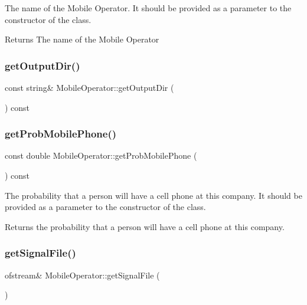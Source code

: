 The name of the Mobile Operator. It should be provided as a parameter to the constructor of the class. \begin{DoxyReturn}{Returns}
The name of the Mobile Operator 
\end{DoxyReturn}
\mbox{\label{class_mobile_operator_a58ac70813094ddefdf0ba2552ec31fe9}} 
\subsubsection{\texorpdfstring{get\+Output\+Dir()}{getOutputDir()}}
{\footnotesize\ttfamily const string\& Mobile\+Operator\+::get\+Output\+Dir (\begin{DoxyParamCaption}{ }\end{DoxyParamCaption}) const}

\mbox{\label{class_mobile_operator_afe59edb4ba22cea7fab968fdd1e2ce31}} 
\subsubsection{\texorpdfstring{get\+Prob\+Mobile\+Phone()}{getProbMobilePhone()}}
{\footnotesize\ttfamily const double Mobile\+Operator\+::get\+Prob\+Mobile\+Phone (\begin{DoxyParamCaption}{ }\end{DoxyParamCaption}) const}

The probability that a person will have a cell phone at this company. It should be provided as a parameter to the constructor of the class. \begin{DoxyReturn}{Returns}
the probability that a person will have a cell phone at this company. 
\end{DoxyReturn}
\mbox{\label{class_mobile_operator_ac39217182fd0ce7ef5da3b9018bcb965}} 
\subsubsection{\texorpdfstring{get\+Signal\+File()}{getSignalFile()}}
{\footnotesize\ttfamily ofstream\& Mobile\+Operator\+::get\+Signal\+File (\begin{DoxyParamCaption}{ }\end{DoxyParamCaption})}

